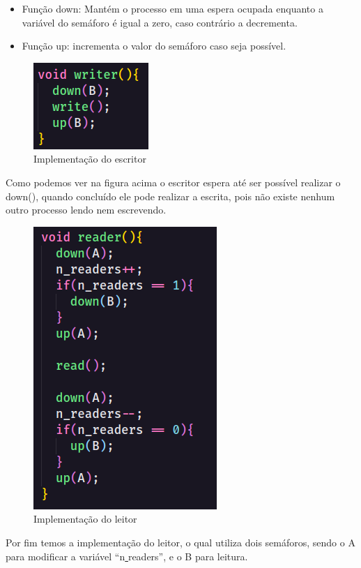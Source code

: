 \documentclass[12pt, a4paper]{article}
\begin{document}
\begin{itemize}
	\item Função down: Mantém o processo em uma espera ocupada enquanto a variável do semáforo é igual a zero, caso contrário a decrementa.
	\item Função up: incrementa o valor do semáforo caso seja possível.
\end{itemize}

\begin{figure}[!htb]
	\centering
	\includegraphics[keepaspectratio, scale=1.2]{3.png}
	\caption{\label{fig:3.png} Implementação do escritor}
\end{figure}

Como podemos ver na figura acima o escritor espera até ser possível realizar o down(), quando concluído ele pode realizar a escrita, pois não existe nenhum outro processo lendo nem escrevendo.\\
\begin{figure}[!htb]
	\centering
	\includegraphics[keepaspectratio, scale=0.98]{4.png}
	\caption{\label{fig:4.png}Implementação do leitor}
\end{figure}

Por fim temos a implementação do leitor, o qual utiliza dois semáforos, sendo o A para modificar a variável ``n\underline{ }readers'', e o B para leitura.
\end{document}

